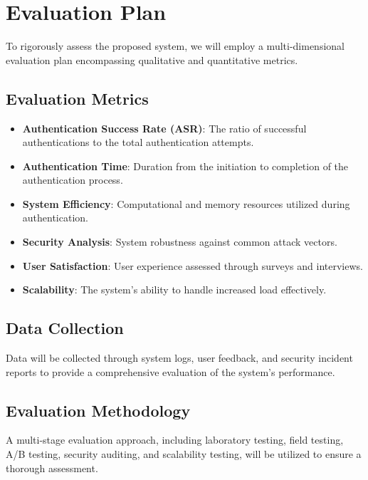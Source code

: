 \section{Evaluation Plan}
\label{sec:eval-plan}

To rigorously assess the proposed system, we will employ a multi-dimensional evaluation plan encompassing qualitative and quantitative metrics.

\subsection{Evaluation Metrics}
\label{subsec:eval-metrics}

\begin{itemize}
    \item \textbf{Authentication Success Rate (ASR)}: The ratio of successful authentications to the total authentication attempts.
    \item \textbf{Authentication Time}: Duration from the initiation to completion of the authentication process.
    \item \textbf{System Efficiency}: Computational and memory resources utilized during authentication.
    \item \textbf{Security Analysis}: System robustness against common attack vectors.
    \item \textbf{User Satisfaction}: User experience assessed through surveys and interviews.
    \item \textbf{Scalability}: The system's ability to handle increased load effectively.
\end{itemize}

\subsection{Data Collection}
\label{subsec:data-collection}

Data will be collected through system logs, user feedback, and security incident reports to provide a comprehensive evaluation of the system's performance.

\subsection{Evaluation Methodology}
\label{subsec:eval-method}

A multi-stage evaluation approach, including laboratory testing, field testing, A/B testing, security auditing, and scalability testing, will be utilized to ensure a thorough assessment.
